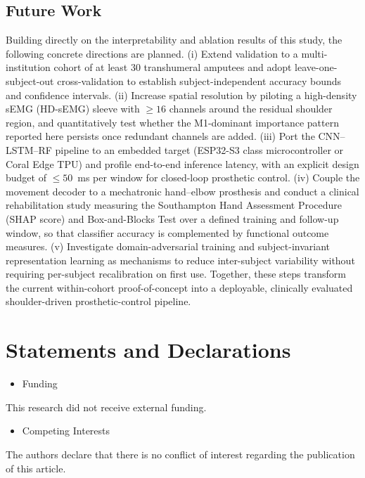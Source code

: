 \documentclass{elektr}
\newcommand{\yh}[1]{#1}
\begin{document}
\subsection*{Future Work}
\yh{Building directly on the interpretability and ablation results of this study, the following concrete directions are planned. (i) Extend validation to a multi-institution cohort of at least 30 transhumeral amputees and adopt leave-one-subject-out cross-validation to establish subject-independent accuracy bounds and confidence intervals. (ii) Increase spatial resolution by piloting a high-density sEMG (HD-sEMG) sleeve with $\ge 16$ channels around the residual shoulder region, and quantitatively test whether the M1-dominant importance pattern reported here persists once redundant channels are added. (iii) Port the CNN--LSTM--RF pipeline to an embedded target (ESP32-S3 class microcontroller or Coral Edge TPU) and profile end-to-end inference latency, with an explicit design budget of $\le 50$~ms per window for closed-loop prosthetic control. (iv) Couple the movement decoder to a mechatronic hand--elbow prosthesis and conduct a clinical rehabilitation study measuring the Southampton Hand Assessment Procedure (SHAP score) and Box-and-Blocks Test over a defined training and follow-up window, so that classifier accuracy is complemented by functional outcome measures. (v) Investigate domain-adversarial training and subject-invariant representation learning as mechanisms to reduce inter-subject variability without requiring per-subject recalibration on first use. Together, these steps transform the current within-cohort proof-of-concept into a deployable, clinically evaluated shoulder-driven prosthetic-control pipeline.}

\section{Statements and Declarations}
\begin{itemize}
	\item Funding
\end{itemize}
This research did not receive external funding.
\begin{itemize}
	\item Competing Interests
\end{itemize}
The authors declare that there is no conflict of interest regarding the publication of this article.
\end{document}
